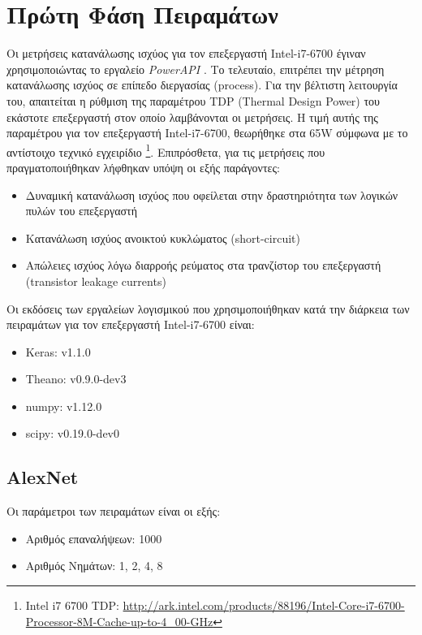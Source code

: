 \section{Πρώτη Φάση Πειραμάτων}
\label{sec:experiments_phase1}

Οι μετρήσεις κατανάλωσης ισχύος για τον επεξεργαστή Intel-i7-6700 έγιναν
χρησιμοποιώντας το εργαλείο \emph{PowerAPI} \cite{grant2016standardizing}.
Το τελευταίο, επιτρέπει την μέτρηση κατανάλωσης ισχύος σε
επίπεδο διεργασίας (process). Για την βέλτιστη λειτουργία του,
απαιτείται η ρύθμιση της παραμέτρου TDP (Thermal Design Power) του εκάστοτε
επεξεργαστή στον οποίο λαμβάνονται οι μετρήσεις. Η τιμή αυτής της παραμέτρου για τον επεξεργαστή
Intel-i7-6700, θεωρήθηκε στα 65W σύμφωνα με το αντίστοιχο τεχνικό εγχειρίδιο
\footnote{Intel i7 6700 TDP: \url{http://ark.intel.com/products/88196/Intel-Core-i7-6700-Processor-8M-Cache-up-to-4_00-GHz}}.
Επιπρόσθετα, για τις μετρήσεις που πραγματοποιήθηκαν λήφθηκαν υπόψη οι εξής παράγοντες:
\begin{itemize}
  \item{Δυναμική κατανάλωση ισχύος που οφείλεται στην δραστηριότητα των λογικών πυλών του επεξεργαστή}
  \item{Κατανάλωση ισχύος ανοικτού κυκλώματος (short-circuit)}
  \item{Απώλειες ισχύος λόγω διαρροής ρεύματος στα τρανζίστορ του επεξεργαστή (transistor leakage currents)}
\end{itemize}

Οι εκδόσεις των εργαλείων λογισμικού που χρησιμοποιήθηκαν
κατά την διάρκεια των πειραμάτων για τον επεξεργαστή Intel-i7-6700 είναι:
\begin{itemize}
  \item{Keras: v1.1.0}
  \item{Theano: v0.9.0-dev3}
  \item{numpy: v1.12.0}
  \item{scipy: v0.19.0-dev0}
\end{itemize}



\subsection{AlexNet}

Οι παράμετροι των πειραμάτων είναι οι εξής:
\begin{itemize}
  \item{Αριθμός επαναλήψεων: 1000}
  \item{Αριθμός Νημάτων: 1, 2, 4, 8}
\end{itemize}

